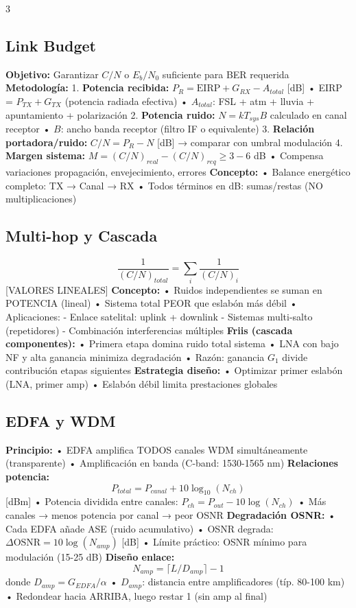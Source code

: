 \documentclass[a4paper,6pt]{extarticle}
\begin{document}
\begin{multicols}{3}
\subsection*{Link Budget}
\textbf{Objetivo:} Garantizar $C/N$ o $E_b/N_0$ suficiente para BER requerida
\textbf{Metodología:}
1. \textbf{Potencia recibida:}
   $P_R = \text{EIRP} + G_{RX} - A_{total}$ [dB]
   • EIRP = $P_{TX} + G_{TX}$ (potencia radiada efectiva)
   • $A_{total}$: FSL + atm + lluvia + apuntamiento + polarización
2. \textbf{Potencia ruido:}
   $N = kT_{sys}B$ calculado en canal receptor
   • $B$: ancho banda receptor (filtro IF o equivalente)
3. \textbf{Relación portadora/ruido:}
   $C/N = P_R - N$ [dB] → comparar con umbral modulación
4. \textbf{Margen sistema:}
   $M = (C/N)_{real} - (C/N)_{req} \geq 3-6$ dB
   • Compensa variaciones propagación, envejecimiento, errores
\textbf{Concepto:}
• Balance energético completo: TX → Canal → RX
• Todos términos en dB: sumas/restas (NO multiplicaciones)

\subsection*{Multi-hop y Cascada}
$$\frac{1}{(C/N)_{total}} = \sum_i \frac{1}{(C/N)_i}$$ [VALORES LINEALES]
\textbf{Concepto:}
• Ruidos independientes se suman en POTENCIA (lineal)
• Sistema total PEOR que eslabón más débil
• Aplicaciones:
  - Enlace satelital: uplink + downlink
  - Sistemas multi-salto (repetidores)
  - Combinación interferencias múltiples
\textbf{Friis (cascada componentes):}
• Primera etapa domina ruido total sistema
• LNA con bajo NF y alta ganancia minimiza degradación
• Razón: ganancia $G_1$ divide contribución etapas siguientes
\textbf{Estrategia diseño:}
• Optimizar primer eslabón (LNA, primer amp)
• Eslabón débil limita prestaciones globales

\subsection*{EDFA y WDM}
\textbf{Principio:}
• EDFA amplifica TODOS canales WDM simultáneamente (transparente)
• Amplificación en banda (C-band: 1530-1565 nm)
\textbf{Relaciones potencia:}
$$P_{total} = P_{canal} + 10\log_{10}(N_{ch})$$ [dBm]
• Potencia dividida entre canales: $P_{ch} = P_{out} - 10\log(N_{ch})$
• Más canales → menos potencia por canal → peor OSNR
\textbf{Degradación OSNR:}
• Cada EDFA añade ASE (ruido acumulativo)
• OSNR degrada: $\Delta\text{OSNR} = 10\log(N_{amp})$ [dB]
• Límite práctico: OSNR mínimo para modulación (15-25 dB)
\textbf{Diseño enlace:}
$$N_{amp} = \lceil L/D_{amp}\rceil - 1$$ donde $D_{amp} = G_{EDFA}/\alpha$
• $D_{amp}$: distancia entre amplificadores (típ. 80-100 km)
• Redondear hacia ARRIBA, luego restar 1 (sin amp al final)


\end{multicols}
\end{document}
